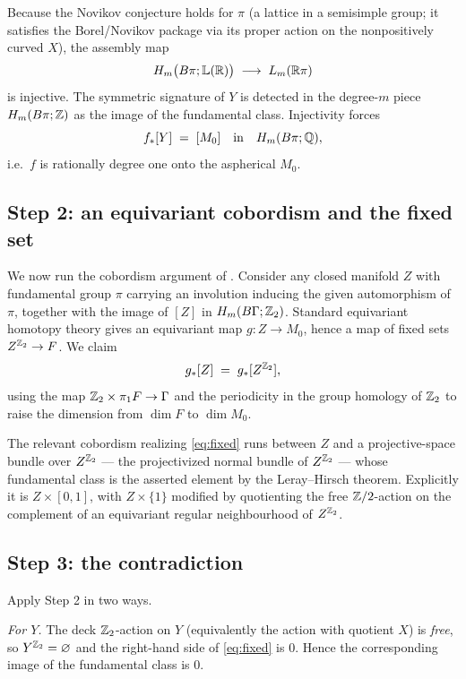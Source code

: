 \documentclass[11pt]{article}
\begin{document}
Because the Novikov conjecture holds for $\pi$ (a lattice in a semisimple group;
it satisfies the Borel/Novikov package via its proper action on the
nonpositively curved $X$), the assembly map
\[
  H_m\bigl(B\pi;\mathbb{L}(\mathbb{R})\bigr)\;\longrightarrow\;L_m(\mathbb{R}\pi)
\]
is injective. The symmetric signature of $Y$ is detected in the degree-$m$ piece
$H_m(B\pi;\mathbb{Z})$ as the image of the fundamental class. Injectivity forces
\begin{equation}\label{eq:deg-one}
  f_*[Y]\;=\;[M_0]\quad\text{in}\quad H_m(B\pi;\mathbb{Q}),
\end{equation}
i.e.\ $f$ is rationally degree one onto the aspherical $M_0$.

\subsection*{Step 2: an equivariant cobordism and the fixed set}

We now run the cobordism argument of \cite{W1}. Consider any closed manifold $Z$
with fundamental group $\pi$ carrying an involution inducing the given
automorphism of $\pi$, together with the image of $[Z]$ in $H_m(B\Gamma;\mathbb{Z}_2)$.
Standard equivariant homotopy theory gives an equivariant map $g:Z\to M_0$,
hence a map of fixed sets $Z^{\mathbb{Z}_2}\to F$. We claim
\begin{equation}\label{eq:fixed}
  g_*[Z]\;=\;g_*[Z^{\mathbb{Z}_2}],
\end{equation}
using the map $\mathbb{Z}_2\times\pi_1F\to\Gamma$ and the periodicity in the group
homology of $\mathbb{Z}_2$ to raise the dimension from $\dim F$ to $\dim M_0$.

The relevant cobordism realizing \eqref{eq:fixed} runs between $Z$ and a
projective-space bundle over $Z^{\mathbb{Z}_2}$ --- the projectivized normal bundle of
$Z^{\mathbb{Z}_2}$ --- whose fundamental class is the asserted element by the
Leray--Hirsch theorem. Explicitly it is $Z\times[0,1]$, with $Z\times\{1\}$
modified by quotienting the free $\mathbb{Z}/2$-action on the complement of an
equivariant regular neighbourhood of $Z^{\mathbb{Z}_2}$.

\subsection*{Step 3: the contradiction}

Apply Step 2 in two ways.

\emph{For $Y$.} The deck $\mathbb{Z}_2$-action on $Y$ (equivalently the action with
quotient $X$) is \emph{free}, so $Y^{\mathbb{Z}_2}=\varnothing$ and the right-hand side
of \eqref{eq:fixed} is $0$. Hence the corresponding image of the fundamental
class is $0$.
\end{document}
